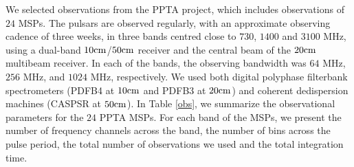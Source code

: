 \documentclass[useAMS,usenatbib]{mn2e}
\begin{document}
We selected observations from the PPTA project, which includes observations 
of $24$ MSPs. 
%
The pulsars are observed regularly, with an approximate observing cadence of 
three weeks, in three bands centred close to $730$, $1400$ and $3100$ MHz, 
using a dual-band $10\rm{cm}$/$50\rm{cm}$ receiver and the central beam 
of the $20\rm{cm}$ multibeam receiver. In each of the bands, the observing 
bandwidth was $64$ MHz, $256$ MHz, and $1024$ MHz, respectively. 
%
We used both digital polyphase filterbank spectrometers (PDFB4 at $10\rm{cm}$ 
and PDFB3 at $20\rm{cm}$) and coherent dedispersion machines (CASPSR at $50\rm{cm}$). 
%
In Table \ref{obs}, we summarize the observational parameters for the $24$ PPTA MSPs. 
%
For each band of the MSPs, we present the number of frequency channels across 
the band, the number of bins across the pulse period, the total number 
of observations we used and the total integration time.
%
%
\end{document}
